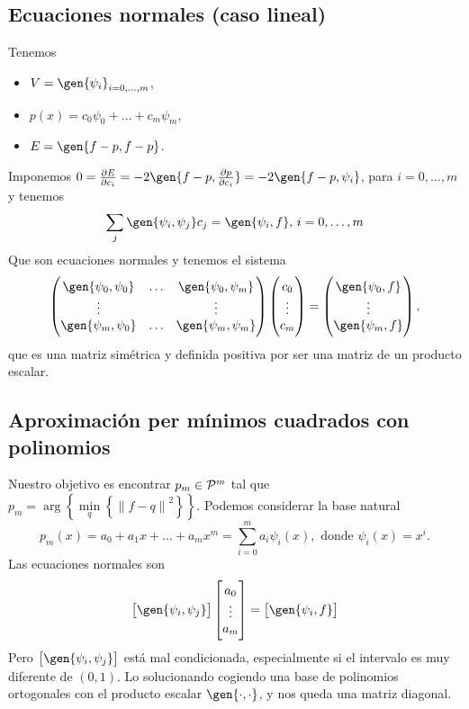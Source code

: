 \subsection{Ecuaciones normales (caso lineal)}
Tenemos
\begin{itemize}
    \item $V = \gen{\psi_i}_{i=0,\dots, m}$,
    \item $p\left( x \right) = c_0\psi_0 + \dots + c_m\psi_m$,
    \item $E = \gen{f-p, f-p}$.
\end{itemize}
Imponemos $0 = \frac{\partial E}{\partial c_i} = -2 \gen{f-p, \frac{\partial p}{\partial c_i}} = -2 \gen{f-p, \psi_i}$, para $i = 0, \dots, m$ y tenemos
\[
    \sum_j \gen{\psi_i, \psi_j}c_j = \gen{\psi_i, f},\, i = 0,\dots, m
\]
Que son ecuaciones normales y tenemos el sistema
\[
    \begin{pmatrix}
        \gen{\psi_0, \psi_0} & \dots & \gen{\psi_0, \psi_m} \\
        \vdots & & \vdots \\
        \gen{\psi_m, \psi_0} & \dots & \gen{\psi_m, \psi_m}
    \end{pmatrix}
    \begin{pmatrix}
        c_0 \\
        \vdots \\
        c_m
    \end{pmatrix}
    =
    \begin{pmatrix}
        \gen{\psi_0, f} \\
        \vdots \\
        \gen{\psi_m, f}
    \end{pmatrix},
\]
que es una matriz simétrica y definida positiva por ser una matriz de un producto escalar.

\subsection{Aproximación per mínimos cuadrados con polinomios}
Nuestro objetivo es encontrar $p_m \in \mathcal{P}^m$ tal que $p_m = \arg\left\{ \min\limits_q \left\{ \left\|f-q\right\|^2 \right\} \right\}$. Podemos considerar la base natural
\[
    p_m(x) = a_0 + a_1x + \dots + a_mx^m = \sum_{i=0}^m a_i \psi_i(x), \text{ donde }\psi_i(x) = x^i.
\]
Las ecuaciones normales son
\[
    \left[ \gen{\psi_i, \psi_j} \right]
    \begin{bmatrix}
        a_0 \\
        \vdots \\
        a_m
    \end{bmatrix}
    = \left[ \gen{\psi_i, f} \right]
\]
Pero $\left[ \gen{\psi_i, \psi_j} \right]$ está mal condicionada, especialmente si el intervalo es muy diferente de $(0, 1)$. Lo solucionando cogiendo una base de polinomios ortogonales con el producto escalar $\gen{\cdot, \cdot}$, y nos queda una matriz diagonal.
